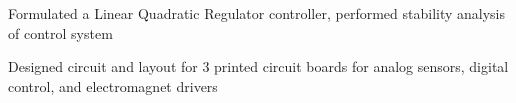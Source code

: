 \documentclass[letterpaper]{deedy-resume} %
\begin{document}
\begin{minipage}[t]{1\textwidth}
\begin{tightitemize}
\item Formulated a Linear Quadratic Regulator controller, performed stability analysis of control system

\item Designed circuit and layout for 3 printed circuit boards for analog sensors, digital control, and electromagnet drivers

\end{tightitemize}

\sectionspace %

\end{minipage} %
\newpage %
\end{document}
